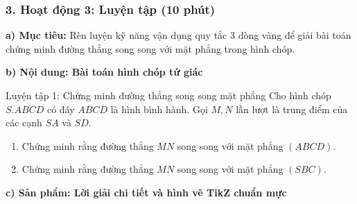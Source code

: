 \documentclass[12pt, a4paper]{article}
\begin{document}
\subsubsection*{3. Hoạt động 3: Luyện tập (10 phút)}

\noindent \textbf{a) Mục tiêu:}
Rèn luyện kỹ năng vận dụng quy tắc 3 dòng vàng để giải bài toán chứng minh đường thẳng song song với mặt phẳng trong hình chóp.

\noindent \textbf{b) Nội dung: Bài toán hình chóp tứ giác}
\begin{pedabox}{Luyện tập 1: Chứng minh đường thẳng song song mặt phẳng}
Cho hình chóp $S.ABCD$ có đáy $ABCD$ là hình bình hành. Gọi $M, N$ lần lượt là trung điểm của các cạnh $SA$ và $SD$.
\begin{enumerate}[leftmargin=0.6cm]
    \item Chứng minh rằng đường thẳng $MN$ song song với mặt phẳng $(ABCD)$.
    \item Chứng minh rằng đường thẳng $MN$ song song với mặt phẳng $(SBC)$.
\end{enumerate}
\end{pedabox}

\noindent \textbf{c) Sản phẩm: Lời giải chi tiết và hình vẽ TikZ chuẩn mực}
\begin{center}
\end{center}
\end{document}
